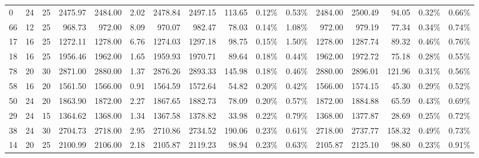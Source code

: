 \begin{tabular}{lllrrrrrrllrrrll}
0  &  24 &  25 &   2475.97 &    2484.00 &        2.02 &       2478.84 &        2497.15 &          113.65 &            0.12\% &             0.53\% &       2484.00 &        2500.49 &           94.05 &            0.32\% &             0.66\% \\
66 &  12 &  25 &    968.73 &     972.00 &        8.09 &        970.07 &         982.47 &           78.03 &            0.14\% &             1.08\% &        972.00 &         979.19 &           77.34 &            0.34\% &             0.74\% \\
17 &  16 &  25 &   1272.11 &    1278.00 &        6.76 &       1274.03 &        1297.18 &           98.75 &            0.15\% &             1.50\% &       1278.00 &        1287.74 &           89.32 &            0.46\% &             0.76\% \\
18 &  16 &  25 &   1956.46 &    1962.00 &        1.65 &       1959.93 &        1970.71 &           89.64 &            0.18\% &             0.44\% &       1962.00 &        1972.72 &           75.18 &            0.28\% &             0.55\% \\
78 &  20 &  30 &   2871.00 &    2880.00 &        1.37 &       2876.26 &        2893.33 &          145.98 &            0.18\% &             0.46\% &       2880.00 &        2896.01 &          121.96 &            0.31\% &             0.56\% \\
58 &  16 &  20 &   1561.50 &    1566.00 &        0.91 &       1564.59 &        1572.64 &           54.82 &            0.20\% &             0.42\% &       1566.00 &        1574.15 &           45.30 &            0.29\% &             0.52\% \\
50 &  24 &  20 &   1863.90 &    1872.00 &        2.27 &       1867.65 &        1882.73 &           78.09 &            0.20\% &             0.57\% &       1872.00 &        1884.88 &           65.59 &            0.43\% &             0.69\% \\
29 &  24 &  15 &   1364.62 &    1368.00 &        1.34 &       1367.58 &        1378.82 &           33.98 &            0.22\% &             0.79\% &       1368.00 &        1377.87 &           28.69 &            0.25\% &             0.72\% \\
38 &  24 &  30 &   2704.73 &    2718.00 &        2.95 &       2710.86 &        2734.52 &          190.06 &            0.23\% &             0.61\% &       2718.00 &        2737.77 &          158.32 &            0.49\% &             0.73\% \\
14 &  20 &  25 &   2100.99 &    2106.00 &        2.18 &       2105.87 &        2119.23 &           98.94 &            0.23\% &             0.63\% &       2105.87 &        2125.10 &           98.80 &            0.23\% &             0.91\% \\

\end{tabular}
